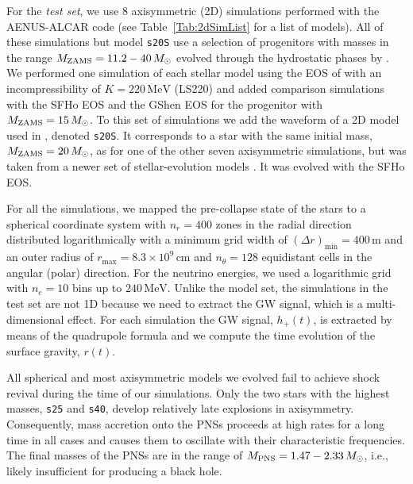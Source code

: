{For the {\it test set}, we use $8$ axisymmetric (2D) simulations performed with the {\sc AENUS-ALCAR} code
(see Table~\ref{Tab:2dSimList} for a list of models).
All of these simulations but model \texttt{s20S} use a selection of progenitors with masses in the range} $M_{\mathrm{ZAMS}} = 11.2 - 40 \, M_{\odot}$
 evolved through the hydrostatic phases by
\cite{Woosley_Heger_Weaver__2002__ReviewsofModernPhysics__The_evolution_and_explosion_of_massive_stars}.
We performed one simulation of each stellar model using the EOS of \cite{Lattimer_Swesty__1991__NuclearPhysicsA__LS-EOS} with
an incompressibility of $K = 220 \, \mathrm{MeV}$ (LS220) and added
comparison simulations with the SFHo EOS
\cite{Steiner_et_al__2013__apj__Core-collapseSupernovaEquationsofStateBasedonNeutronStarObservations}
and the GShen EOS 
\cite{Shen_et_al__2011__prc__Newequationofstateforastrophysicalsimulations}
for the {progenitor} with $M_{\mathrm{ZAMS}} = 15 \, M_{\odot}$. To this set of
simulations we add the waveform of a 2D model used in
\cite{Torres:2019a}, denoted \texttt{s20S}. It corresponds to a star
with the same initial mass, $M_{\mathrm{ZAMS}} = 20 \, M_{\odot}$, as for
one of the other seven axisymmetric simulations, but was taken from a
newer set of stellar-evolution models
\cite{Woosley_Heger__2007__physrep__Nucleosynthesisandremnantsinmassivestarsofsolarmetallicity}.
It was evolved with the SFHo EOS.


{For all the simulations,} we mapped the pre-collapse state of the stars to a spherical
coordinate system with $n_r = 400$ zones in the radial direction
distributed logarithmically with a minimum grid width of
$(\Delta r)_{\mathrm{min}} = 400 \, \mathrm{m}$ and an outer radius of
$r_{\mathrm{max}} = 8.3 \times 10^{9} \, \mathrm{cm}$ and
$n_{\theta} = 128$ equidistant cells in the angular (polar) direction. For the
neutrino energies, we used a logarithmic grid with $n_e = 10$ bins up
to $240 \, \mathrm{MeV}$.
{Unlike the model set, the simulations in the test set are not 1D because we need to 
extract the GW signal, which is a multi-dimensional effect. For each simulation
the GW signal, $h_+(t)$, is extracted by means of the quadrupole formula and we compute the 
time evolution of the surface gravity, $r(t)$.}

All spherical and most axisymmetric models we evolved fail to achieve shock
revival during the time of our simulations. Only the two stars with
the highest masses, \texttt{s25} and \texttt{s40}, develop relatively
late explosions in axisymmetry. Consequently, mass accretion onto the
PNSs proceeds at high rates for a long time in all cases and causes
them to oscillate with their characteristic frequencies. The final
masses of the PNSs are in the range of
$M_{\mathrm{PNS}} = 1.47 - 2.33 \, M_{\odot}$, i.e., likely insufficient for
producing a black hole.


 	


